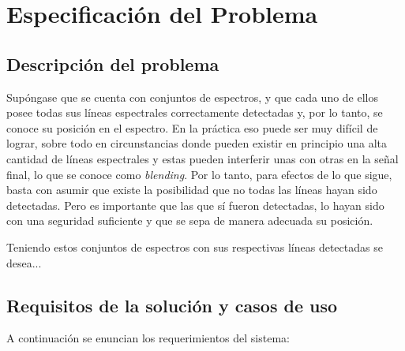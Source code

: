 \chapter{Especificación del Problema}


\section{Descripción del problema}


Supóngase que se cuenta con conjuntos de espectros, y que cada uno de ellos posee todas sus líneas espectrales correctamente detectadas y, por lo tanto, se conoce su posición en el espectro. En la práctica eso puede ser muy difícil de lograr, sobre todo en circunstancias donde pueden existir en principio una alta cantidad de líneas espectrales y estas pueden interferir unas con otras en la señal final, lo que se conoce como \textit{blending}. Por lo tanto, para efectos de lo que sigue, basta con asumir que existe la posibilidad que no todas las líneas hayan sido detectadas. Pero es importante que las que sí fueron detectadas, lo hayan sido con una seguridad suficiente y que se sepa de manera adecuada su posición.

Teniendo estos conjuntos de espectros con sus respectivas líneas detectadas se desea... 


\section{Requisitos de la solución y casos de uso}

A continuación se enuncian los requerimientos del sistema:

